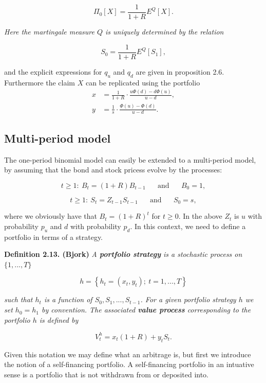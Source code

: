\documentclass[
]{book}
\begin{document}
\[
\Pi_0[X]=\frac{1}{1+R}E^Q[X].\tag{2.4}
\]

\emph{Here the martingale measure \(Q\) is uniquely determined by the relation}

\[
S_0=\frac{1}{1+R}E^Q[S_1],\tag{2.5}
\]

and the explicit expressions for \(q_u\) and \(q_d\) are given in proposition 2.6. Furthermore the claim \(X\) can be replicated using the portfolio
\begin{align*}
x&=\frac{1}{1+R}\cdot\frac{u\Phi(d)-d\Phi(u)}{u-d},\tag{2.6}\\
y&=\frac{1}{s}\cdot\frac{\Phi(u)-\Phi(d)}{u-d}.\tag{2.7}
\end{align*}

\newpage

\hypertarget{multi-period-model}{%
\subsection{Multi-period model}\label{multi-period-model}}

The one-period binomial model can easily be extended to a multi-period model, by assuming that the bond and stock pricess evolve by the processes:

\[
t\ge1:\ B_t=(1+R)B_{t-1}\hspace{20pt}\text{and}\hspace{20pt}B_0=1,
\]

\[
t\ge1:\ S_t=Z_{t-1}S_{t-1}\hspace{20pt}\text{and}\hspace{20pt}S_0=s,
\]

where we obviously have that \(B_t=(1+R)^t\) for \(t\ge 0\). In the above \(Z_t\) is \(u\) with probability \(p_u\) and \(d\) with probability \(p_d\). In this context, we need to define a portfolio in terms of a strategy.

\textbf{Definition 2.13. (Bjork)} \emph{A \textbf{portfolio strategy} is a stochastic process on \(\{1,...,T\}\)}

\[
h=\left\{h_t=(x_t,y_t);\ t=1,...,T\right\}
\]

\emph{such that \(h_t\) is a function of \(S_0,S_1,...,S_{t-1}\). For a given portfolio strategy \(h\) we set \(h_0=h_1\) by convention. The associated \textbf{value process} corresponding to the portfolio \(h\) is defined by}

\[
V_t^h=x_t(1+R)+y_tS_t.
\]

Given this notation we may define what an arbitrage is, but first we introduce the notion of a self-financing portfolio. A self-financing portfolio in an intuative sense is a portfolio that is not withdrawn from or deposited into.
\end{document}
